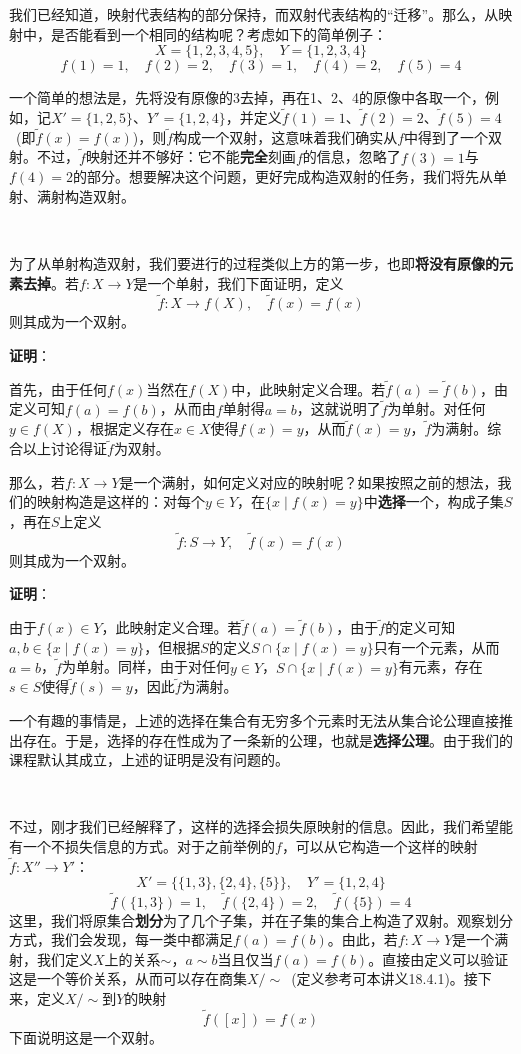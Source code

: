 \documentclass[a4paper,UTF8,fontset=windows,AutoFakeBold]{ctexart}
\newcommand*{\note}{\noindent *}
\newcommand{\proo}[1]{{\vspace{5pt}\kaishu\noindent\textbf{证明}：\vspace{-3pt}
\begin{compactitem}
    \item[] #1
\end{compactitem}
}}
\begin{document}
我们已经知道，映射代表结构的部分保持，而双射代表结构的``迁移''。那么，从映射中，是否能看到一个相同的结构呢？考虑如下的简单例子：
$$X=\{1,2,3,4,5\},\quad Y=\{1,2,3,4\}$$
$$f(1)=1,\quad f(2)=2,\quad f(3)=1,\quad f(4)=2,\quad f(5)=4$$

一个简单的想法是，先将没有原像的3去掉，再在1、2、4的原像中各取一个，例如，记$X'=\{1,2,5\}$、$Y'=\{1,2,4\}$，并定义$\tilde{f}(1)=1$、$\tilde{f}(2)=2$、$\tilde{f}(5)=4$\ (即$\tilde{f}(x)=f(x)$)，则$\tilde{f}$构成一个双射，这意味着我们确实从$f$中得到了一个双射。不过，$\tilde{f}$映射还并不够好：它不能\textbf{完全}刻画$f$的信息，忽略了$f(3)=1$与$f(4)=2$的部分。想要解决这个问题，更好完成构造双射的任务，我们将先从单射、满射构造双射。

\

为了从单射构造双射，我们要进行的过程类似上方的第一步，也即\textbf{将没有原像的元素去掉}。若$f:X\to Y$是一个单射，我们下面证明，定义
$$\tilde{f}:X\to f(X),\quad \tilde{f}(x)=f(x)$$
则其成为一个双射。

\proo{
    首先，由于任何$f(x)$当然在$f(X)$中，此映射定义合理。若$\tilde{f}(a)=\tilde{f}(b)$，由定义可知$f(a)=f(b)$，从而由$f$单射得$a=b$，这就说明了$\tilde{f}$为单射。对任何$y\in f(X)$，根据定义存在$x\in X$使得$f(x)=y$，从而$\tilde{f}(x)=y$，$\tilde{f}$为满射。综合以上讨论得证$\tilde{f}$为双射。
}

那么，若$f:X\to Y$是一个满射，如何定义对应的映射呢？如果按照之前的想法，我们的映射构造是这样的：对每个$y\in Y$，在$\{x\mid f(x)=y\}$中\textbf{选择}一个，构成子集$S$，再在$S$上定义
$$\tilde{f}:S\to Y,\quad \tilde{f}(x)=f(x)$$
则其成为一个双射。

\proo{
    由于$f(x)\in Y$，此映射定义合理。若$\tilde{f}(a)=\tilde{f}(b)$，由于$\tilde{f}$的定义可知$a,b\in\{x\mid f(x)=y\}$，但根据$S$的定义$S\cap\{x\mid f(x)=y\}$只有一个元素，从而$a=b$，$\tilde{f}$为单射。同样，由于对任何$y\in Y$，$S\cap\{x\mid f(x)=y\}$有元素，存在$s\in S$使得$\tilde{f}(s)=y$，因此$\tilde{f}$为满射。
}

\note 一个有趣的事情是，上述的选择在集合有无穷多个元素时无法从集合论公理直接推出存在。于是，选择的存在性成为了一条新的公理，也就是\textbf{选择公理}。由于我们的课程默认其成立，上述的证明是没有问题的。

\

不过，刚才我们已经解释了，这样的选择会损失原映射的信息。因此，我们希望能有一个不损失信息的方式。对于之前举例的$f$，可以从它构造一个这样的映射$\tilde{f}:X''\to Y'$：
$$X'=\{\{1,3\},\{2,4\},\{5\}\},\quad Y'=\{1,2,4\}$$
$$\tilde{f}(\{1,3\})=1,\quad\tilde{f}(\{2,4\})=2,\quad\tilde{f}(\{5\})=4$$
这里，我们将原集合\textbf{划分}为了几个子集，并在子集的集合上构造了双射。观察划分方式，我们会发现，每一类中都满足$f(a)=f(b)$。由此，若$f:X\to Y$是一个满射，我们定义$X$上的关系$\sim$，$a\sim b$当且仅当$f(a)=f(b)$。直接由定义可以验证这是一个等价关系，从而可以存在商集$X/\sim$\ (定义参考可本讲义18.4.1)。接下来，定义$X/\sim$到$Y$的映射
$$\tilde{f}([x])=f(x)$$
下面说明这是一个双射。
\end{document}
